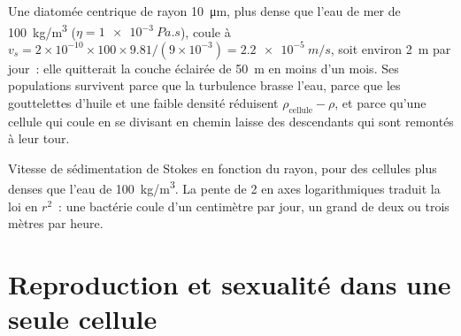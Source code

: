 \begin{example}\label{ex:b2:unicellular-diversity:fall}
Une diatomée centrique de rayon \qty{10}{\micro m}, plus dense que l'eau
de mer de \qty{100}{kg/m^3} ($\eta = \qty{1e-3}{Pa.s}$), coule à
$v_s = 2\times 10^{-10}\times 100\times 9.81/(9\times 10^{-3}) =
\qty{2.2e-5}{m/s}$, soit environ \qty{2}{m} par jour~: elle quitterait
la couche éclairée de \qty{50}{m} en moins d'un mois. Ses populations
survivent parce que la turbulence brasse l'eau, parce que les
gouttelettes d'huile et une faible densité réduisent
$\rho_{\text{cellule}} - \rho$, et parce qu'une cellule qui coule en se
divisant en chemin laisse des descendants qui sont remontés à leur tour.
\end{example}

\begin{omfigure}

{\small Vitesse de sédimentation de Stokes en fonction du rayon, pour
des cellules plus denses que l'eau de \qty{100}{kg/m^3}. La pente de 2
en axes logarithmiques traduit la loi en $r^2$~: une bactérie coule
d'un centimètre par jour, un grand  de deux ou trois mètres par
heure.}
\end{omfigure}

\section{Reproduction et sexualité dans une seule cellule}

